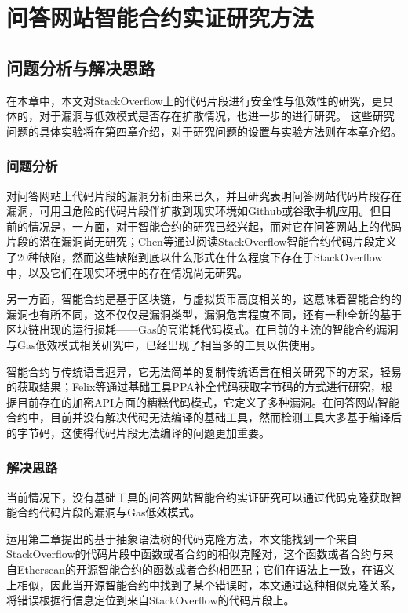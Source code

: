 
\chapter{问答网站智能合约实证研究方法}\label{citations}
\section{问题分析与解决思路}
在本章中，本文对StackOverflow上的代码片段进行安全性与低效性的研究，更具体的，对于漏洞与低效模式是否存在扩散情况，也进一步的进行研究。
这些研究问题的具体实验将在第四章介绍，对于研究问题的设置与实验方法则在本章介绍。

\subsection{问题分析}
对问答网站上代码片段的漏洞分析由来已久，并且研究\cite{fisher1}\cite{dicos}表明问答网站代码片段存在漏洞，可用且危险的代码片段伴扩散到现实环境如Github或谷歌手机应用。但目前的情况是，一方面，对于智能合约的研究已经兴起，而对它在问答网站上的代码片段的潜在漏洞尚无研究；Chen等\cite{define_defect}通过阅读StackOverflow智能合约代码片段定义了20种缺陷，然而这些缺陷到底以什么形式在什么程度下存在于StackOverflow中，以及它们在现实环境中的存在情况尚无研究。

另一方面，智能合约是基于区块链，与虚拟货币高度相关的，这意味着智能合约的漏洞也有所不同，这不仅仅是漏洞类型，漏洞危害程度不同，还有一种全新的基于区块链出现的运行损耗——Gas的高消耗代码模式。在目前的主流的智能合约漏洞与Gas低效模式相关研究中，已经出现了相当多的工具以供使用\cite{Mythril}\cite{Slither}。

智能合约与传统语言迥异，它无法简单的复制传统语言在相关研究下的方案，轻易的获取结果；Felix等\cite{fisher1}通过基础工具PPA\cite{partial_java}补全代码获取字节码的方式进行研究，根据目前存在的加密API方面的糟糕代码模式，它定义了多种漏洞。在问答网站智能合约中，目前并没有解决代码无法编译的基础工具，然而检测工具大多基于编译后的字节码，这使得代码片段无法编译的问题更加重要。

\subsection{解决思路}
当前情况下，没有基础工具的问答网站智能合约实证研究可以通过代码克隆获取智能合约代码片段的漏洞与Gas低效模式。

运用第二章提出的基于抽象语法树的代码克隆方法，本文能找到一个来自StackOverflow的代码片段中函数或者合约的相似克隆对，这个函数或者合约与来自Etherscan的开源智能合约的函数或者合约相匹配；它们在语法上一致，在语义上相似，因此当开源智能合约中找到了某个错误时，本文通过这种相似克隆关系，将错误根据行信息定位到来自StackOverflow的代码片段上。

